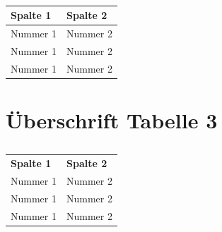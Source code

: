 \begin{table}[!h]
\fontsize{9pt}{13pt}\selectfont
\hspace{-5pt}
\begin{tabularx}{\textwidth + 5pt}{| @{\hspace{3pt}} M | @{\hspace{3pt}} M |}
\hline
\textbf{Spalte 1} & \textbf{Spalte 2} \\
\hline
Nummer 1 & Nummer 2 \\
\hline
Nummer 1 & Nummer 2 \\
\hline
Nummer 1 & Nummer 2 \\
\hline
\end{tabularx}
\caption{}
\end{table}


\vspace{\parskip}
\section*{Überschrift Tabelle 3}

\begin{table}[!h]
\fontsize{9pt}{13pt}\selectfont
\begin{tabularx}{\textwidth}{@{} M M}
\textbf{Spalte 1} & \textbf{Spalte 2} \\
Nummer 1 & Nummer 2 \\
Nummer 1 & Nummer 2 \\
Nummer 1 & Nummer 2 \\
\end{tabularx}
\caption{}
\end{table}

   

